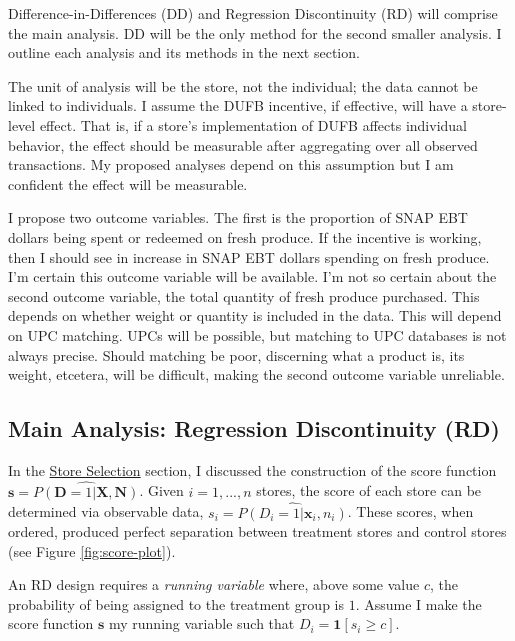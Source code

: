 \documentclass[12pt,letterpaperpaper,]{book}
\begin{document}
Difference-in-Differences (DD) and Regression Discontinuity (RD) will
comprise the main analysis. DD will be the only method for the second
smaller analysis. I outline each analysis and its methods in the next
section.

The unit of analysis will be the store, not the individual; the data
cannot be linked to individuals. I assume the DUFB incentive, if
effective, will have a store-level effect. That is, if a store's
implementation of DUFB affects individual behavior, the effect should be
measurable after aggregating over all observed transactions. My proposed
analyses depend on this assumption but I am confident the effect will be
measurable.

I propose two outcome variables. The first is the proportion of SNAP EBT
dollars being spent or redeemed on fresh produce. If the incentive is
working, then I should see in increase in SNAP EBT dollars spending on
fresh produce. I'm certain this outcome variable will be available. I'm
not so certain about the second outcome variable, the total quantity of
fresh produce purchased. This depends on whether weight or quantity is
included in the data. This will depend on UPC matching. UPCs will be
possible, but matching to UPC databases is not always precise. Should
matching be poor, discerning what a product is, its weight, etcetera,
will be difficult, making the second outcome variable unreliable.

\subsection*{Main Analysis: Regression Discontinuity
(RD)}\label{main-analysis-regression-discontinuity-rd}

In the \protect\hyperlink{store-selection-1}{Store Selection} section, I
discussed the construction of the score function
\(\bm{s} = \widehat{P(\mathbf{D} = 1 | \bm{X}, \bm{N})}\). Given
\(i = 1,...,n\) stores, the score of each store can be determined via
observable data, \(s_i = \widehat{P(D_i = 1|\bm{x}_i, n_i)}\). These
scores, when ordered, produced perfect separation between treatment
stores and control stores (see Figure \ref{fig:score-plot}).

An RD design requires a \emph{running variable} where, above some value
\(c\), the probability of being assigned to the treatment group is
\(1\). Assume I make the score function \(\bm{s}\) my running variable
such that \(D_i = \bm{1}[s_i \ge c]\).
\end{document}
